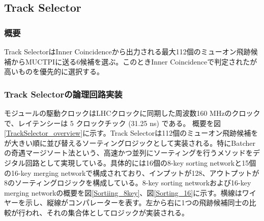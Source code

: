 \subsection{Track Selector}
\subsubsection*{概要}
Track SelectorはInner Coincidenceから出力される最大112個のミューオン飛跡候補からMUCTPIに送る6候補を選ぶ。このときInner Coincidenceで判定された\pt が高いものを優先的に選択する。

\subsubsection*{Track Selectorの論理回路実装}
モジュールの駆動クロックはLHCクロックに同期した周波数160 MHzのクロックで、レイテンシーは 5 クロックチック (31.25 ns) である。
概要を図\ref{TrackSelector_overview}に示す。Track Selectorは112個のミューオン飛跡候補を\pt が大きい順に並び替えるソーティングロジックとして実装される。特にBatcherの奇遇マージソート法\cite{Batcher}という、高速かつ並列にソーティングを行うメソッドをデジタル回路として実現している。具体的には16個の8-key sorting networkと15個の16-key merging networkで構成されており、インプットが128、アウトプットが8のソーティングロジックを構成している。8-key sorting networkおよび16-key merging networkの概要を図\ref{Sortiing_8key}、図\ref{Sorting_16}に示す。横線はワイヤーを示し、縦線がコンパレーターを表す。左から右に1つの飛跡候補同士の比較が行われ、それの集合体としてロジックが実装される。


